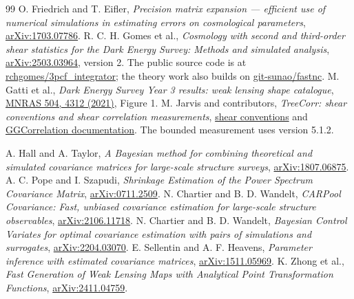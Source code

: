 \documentclass[11pt]{article}
\begin{document}
\begin{thebibliography}{99}
 O. Friedrich and T. Eifler,
\emph{Precision matrix expansion --- efficient use of numerical simulations
in estimating errors on cosmological parameters},
\href{https://arxiv.org/abs/1703.07786}{arXiv:1703.07786}.
 R. C. H. Gomes et al.,
\emph{Cosmology with second and third-order shear statistics for the Dark
Energy Survey: Methods and simulated analysis},
\href{https://arxiv.org/abs/2503.03964}{arXiv:2503.03964}, version 2.
The public source code is at
\href{https://github.com/rchgomes/3pcf_integrator}{rchgomes/3pcf\_integrator};
the theory work also builds on
\href{https://github.com/git-sunao/fastnc}{git-sunao/fastnc}.
 M. Gatti et al.,
\emph{Dark Energy Survey Year 3 results: weak lensing shape catalogue},
\href{https://academic.oup.com/mnras/article/504/3/4312/6211014}
{MNRAS 504, 4312 (2021)}, Figure 1.
 M. Jarvis and contributors,
\emph{TreeCorr: shear conventions and shear correlation measurements},
\href{https://rmjarvis.github.io/TreeCorr/_build/html/shear.html}
{shear conventions} and
\href{https://rmjarvis.github.io/TreeCorr/_build/html/gg.html}
{GGCorrelation documentation}. The bounded measurement uses version 5.1.2.

 A. Hall and A. Taylor,
\emph{A Bayesian method for combining theoretical and simulated covariance
matrices for large-scale structure surveys},
\href{https://arxiv.org/abs/1807.06875}{arXiv:1807.06875}.
 A. C. Pope and I. Szapudi,
\emph{Shrinkage Estimation of the Power Spectrum Covariance Matrix},
\href{https://arxiv.org/abs/0711.2509}{arXiv:0711.2509}.
 N. Chartier and B. D. Wandelt,
\emph{CARPool Covariance: Fast, unbiased covariance estimation for
large-scale structure observables},
\href{https://arxiv.org/abs/2106.11718}{arXiv:2106.11718}.
 N. Chartier and B. D. Wandelt,
\emph{Bayesian Control Variates for optimal covariance estimation with
pairs of simulations and surrogates},
\href{https://arxiv.org/abs/2204.03070}{arXiv:2204.03070}.
 E. Sellentin and A. F. Heavens,
\emph{Parameter inference with estimated covariance matrices},
\href{https://arxiv.org/abs/1511.05969}{arXiv:1511.05969}.
 K. Zhong et al.,
\emph{Fast Generation of Weak Lensing Maps with Analytical Point
Transformation Functions},
\href{https://arxiv.org/abs/2411.04759}{arXiv:2411.04759}.

\end{thebibliography}
\end{document}
